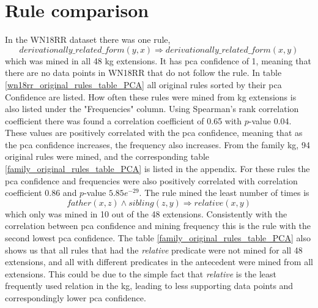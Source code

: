 \newpage
\section{Rule comparison}
In the WN18RR dataset there was one rule, 
\[derivationally\_related\_form(y, x) \Rightarrow derivationally\_related\_form(x, y)\]
which was mined in all 48 \gls{kg} extensions. It has \gls{pca} confidence of 1, meaning that there are no data points in WN18RR that do not follow the rule. In table \ref{wn18rr_original_rules_table_PCA} all original rules sorted by their \gls{pca} Confidence are listed. How often these rules were mined from \gls{kg} extensions is also listed under the "Frequencies" column. Using Spearman's rank correlation coefficient there was found a correlation coefficient of 0.65 with $p$-value 0.04. These values are positively correlated with the \gls{pca} confidence, meaning that as the \gls{pca} confidence increases, the frequency also increases. From the family \gls{kg}, 94 original rules were mined, and the corresponding table \ref{family_original_rules_table_PCA} is listed in the appendix. For these rules the \gls{pca} confidence and frequencies were also positively correlated with correlation coefficient 0.86 and $p$-value $5.85e^{-29}$. The rule mined the least number of times is
\[father(x,z) \wedge sibling(z, y) \Rightarrow relative(x, y)\]
which only was mined in 10 out of the 48 extensions. Consistently with the correlation between \gls{pca} confidence and mining frequency this is the rule with the second lowest \gls{pca} confidence. The table \ref{family_original_rules_table_PCA} also shows us that all rules that had the \textit{relative} predicate were not mined for all 48 extensions, and all with different predicates in the antecedent were mined from all extensions. This could be due to the simple fact that \textit{relative} is the least frequently used relation in the \gls{kg}, leading to less supporting data points and correspondingly lower \gls{pca} confidence.



